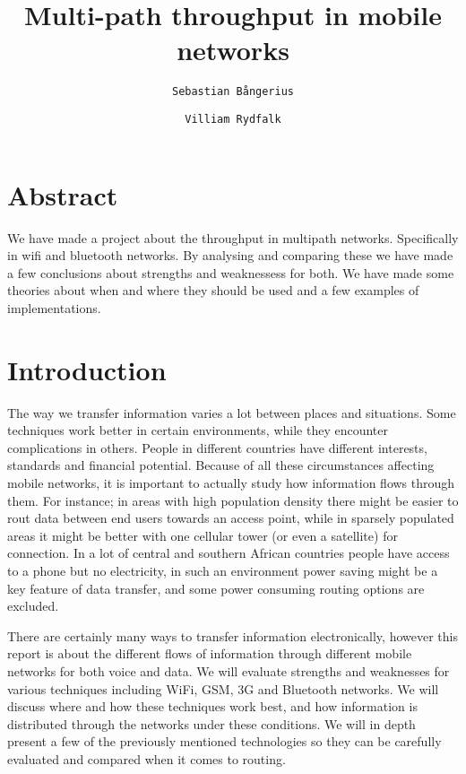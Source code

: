 \documentclass[10pt,a4paper]{article}
\author{
  \texttt{Sebastian Bångerius}
  \and
  \texttt{Villiam Rydfalk}
}
\begin{document}

\title{Multi-path throughput in mobile networks}
\maketitle

\cleardoublepage


\section{Abstract}

We have made a project about the throughput in multipath networks. Specifically in wifi and bluetooth networks. By analysing and comparing these we have made a few conclusions about strengths and weaknessess for both. We have made some theories about when and where they should be used and a few examples of implementations.

\section{Introduction}

The way we transfer information varies a lot between places and situations. Some techniques work better in certain environments, while they encounter complications in others. People in different countries have different interests, standards and financial potential. Because of all these circumstances affecting mobile networks, it is important to actually study how information flows through them. For instance; in areas with high population density there might be easier to rout data between end users towards an access point, while in sparsely populated areas it might be better with one cellular tower (or even a satellite) for connection. In a lot of central and southern African countries people have access to a phone but no electricity, in such an environment power saving might be a key feature of data transfer, and some power consuming routing options are excluded.

There are certainly many ways to transfer information electronically, however this report is about the different flows of information through different mobile networks for both voice and data. We will evaluate strengths and weaknesses for various techniques including WiFi, GSM, 3G and Bluetooth networks. We will discuss where and how these techniques work best, and how information is distributed through the networks under these conditions. We will in depth present a few of the previously mentioned technologies so they can be carefully evaluated and compared when it comes to routing.
\end{document}

